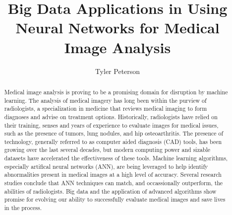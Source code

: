 \documentclass[sigconf]{acmart}
\begin{document}
\title{Big Data Applications in Using Neural Networks for Medical Image Analysis}

\author{Tyler Peterson}

\renewcommand{\shortauthors}{G. v. Laszewski}

\begin{abstract}
Medical image analysis is proving to be a promising domain for disruption by machine learning. The analysis of medical imagery has long been within the purview of radiologists, a specialization in medicine that reviews medical imaging to form diagnoses and advise on treatment options. Historically, radiologists have relied on their training, senses and years of experience to evaluate images for medical issues, such as the presence of tumors, lung nodules, and hip osteoarthritis. The presence of technology, generally referred to as computer aided diagnosis (CAD) tools, has been growing over the last several decades, but modern computing power and sizable datasets have accelerated the effectiveness of these tools. Machine learning algorithms, especially artifical neural networks (ANN), are being leveraged to help identify abnormalities present in medical images at a high level of accuracy. Several research studies conclude that ANN techniques can match, and occassionally outperform, the abilities of radiologists. Big data and the application of advanced algorithms show promise for evolving our ability to successfully evaluate medical images and save lives in the process.
\end{abstract}


\maketitle
\end{document}

